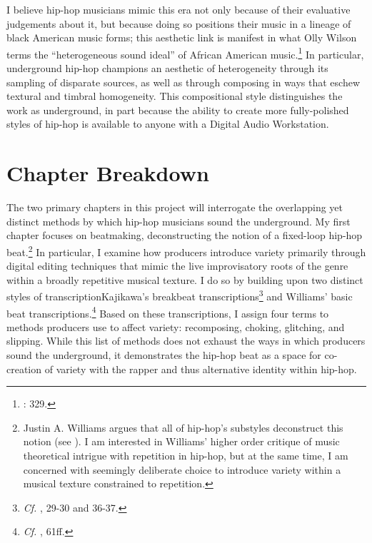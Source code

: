 I believe hip-hop musicians mimic this era not only because of their evaluative judgements about it, but because doing so positions their music in a lineage of black American music forms; this aesthetic link is manifest in what Olly Wilson terms the ``heterogeneous sound ideal'' of African American music.\footnote{\cite{ollywilsonHeterogeneousSoundIdeal1992}: 329.} In particular, underground hip-hop champions an aesthetic of heterogeneity through its sampling of disparate sources, as well as  through composing in ways that eschew textural and timbral homogeneity. This compositional style distinguishes the work as underground, in part because the ability to create more fully-polished styles of hip-hop is available to anyone with a Digital Audio Workstation.
\clearpage

\section{Chapter Breakdown}
The two primary chapters in this project will interrogate the overlapping yet distinct methods by which hip-hop musicians sound the underground. My first chapter focuses on beatmaking, deconstructing the notion of a fixed-loop hip-hop beat.\footnote{Justin A. Williams argues that all of hip-hop's substyles deconstruct this notion (see \cite{justinawilliamsBeatsFlowsResponse2009}). I am interested in Williams' higher order critique of music theoretical intrigue with repetition in hip-hop, but at the same time, I am concerned with seemingly deliberate choice to introduce variety within a musical texture constrained to repetition.} In particular, I examine how producers introduce variety primarily through digital editing techniques that mimic the live improvisatory roots of the genre within a broadly repetitive musical texture. I do so by building upon two distinct styles of transcription\textemdash Kajikawa's breakbeat  transcriptions\footnote{\textit{Cf.} \cite{lorenkajikawaSoundingRaceRap2015}, 29-30 and 36-37.} and Williams' basic beat transcriptions.\footnote{\textit{Cf.} \cite{justinawilliamsRhyminStealinMusical2013}, 61ff.} Based on these transcriptions, I assign four terms to methods producers use to affect variety: recomposing, choking, glitching, and slipping. While this list of methods does not exhaust the ways in which producers sound the underground, it demonstrates the hip-hop beat as a space for co-creation of variety with the rapper and thus alternative identity within hip-hop.

